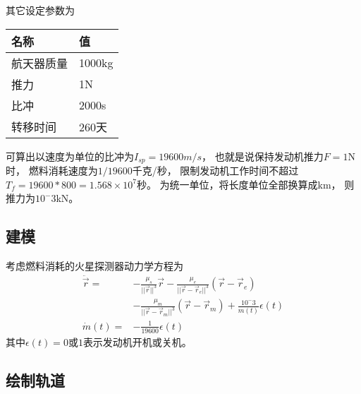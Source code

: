 其它设定参数为
\begin{center}\begin{tabular}{ll}
    \toprule
    名称 & 值 \\
    \midrule
    航天器质量 & 1000kg \\
    推力 & 1N \\
    比冲 & 2000s \\
    转移时间 & 260天 \\
    \bottomrule
\end{tabular}\end{center}
可算出以速度为单位的比冲为$I_{sp}=19600m/s$，
也就是说保持发动机推力$F=1$N时，
燃料消耗速度为$1/19600$千克/秒，
限制发动机工作时间不超过$T_f=19600*800=1.568\times10^7$秒。
为统一单位，将长度单位全部换算成km，
则推力为$10^-3$kN。

\subsection{建模}
考虑燃料消耗的火星探测器动力学方程为
\begin{align*}
    \ddot{\vec{r}} =& -\frac{\mu_s}{||\vec{r}||^3}\vec{r}
    - \frac{\mu_e}{||\vec{r}-\vec{r}_e||^3}(\vec{r}-\vec{r}_e) \\
    &- \frac{\mu_m}{||\vec{r}-\vec{r}_m||^3}(\vec{r}-\vec{r}_m)
    + \frac{10^-3}{m(t)}\epsilon(t) \\
    \dot{m}(t) =& -\frac{1}{19600}\epsilon(t)
\end{align*}
其中$\epsilon(t)=0$或$1$表示发动机开机或关机。

\subsection{绘制轨道}

